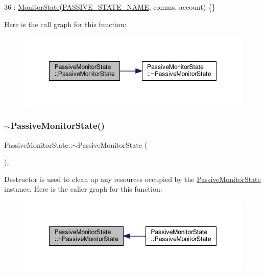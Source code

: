 \begin{DoxyCode}
36         : \hyperlink{class_monitor_state_ace027ab9e5703ac4e4b808eeebc3c961}{MonitorState}(\hyperlink{_passive_monitor_state_8h_a01326d372e7d0a078fe71bdab8adf0d9}{PASSIVE\_STATE\_NAME}, comms, account) \{\}
\end{DoxyCode}
Here is the call graph for this function\+:\nopagebreak
\begin{figure}[H]
\begin{center}
\leavevmode
\includegraphics[width=348pt]{dd/d30/class_passive_monitor_state_a91d992e619e8e1d3d47875a1933542b7_cgraph}
\end{center}
\end{figure}
\mbox{\label{class_passive_monitor_state_a43a2e90a01187c40513899e4f9b5d804}} 
\subsubsection{\texorpdfstring{$\sim$\+Passive\+Monitor\+State()}{~PassiveMonitorState()}}
{\footnotesize\ttfamily Passive\+Monitor\+State\+::$\sim$\+Passive\+Monitor\+State (\begin{DoxyParamCaption}{ }\end{DoxyParamCaption})\hspace{0.3cm}{\ttfamily [override]}, {\ttfamily [default]}}

Destructor is used to clean up any resources occupied by the \hyperlink{class_passive_monitor_state}{Passive\+Monitor\+State} instance. Here is the caller graph for this function\+:\nopagebreak
\begin{figure}[H]
\begin{center}
\leavevmode
\includegraphics[width=348pt]{dd/d30/class_passive_monitor_state_a43a2e90a01187c40513899e4f9b5d804_icgraph}
\end{center}
\end{figure}


